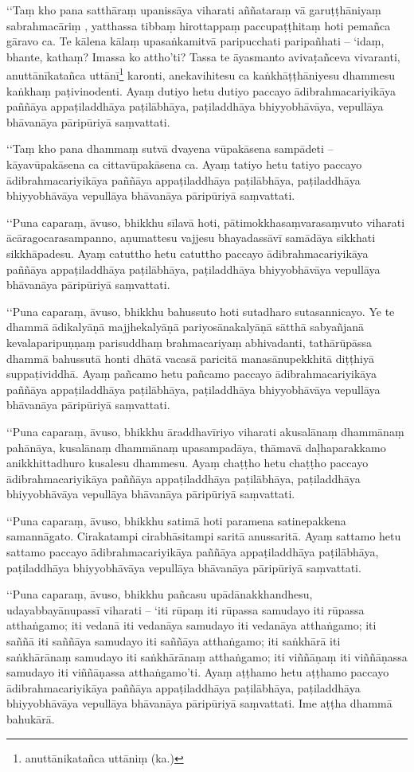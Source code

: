 ‘‘Taṃ kho pana satthāraṃ upanissāya viharati aññataraṃ vā garuṭṭhāniyaṃ sabrahmacāriṃ , yatthassa tibbaṃ hirottappaṃ paccupaṭṭhitaṃ hoti pemañca gāravo ca. Te kālena kālaṃ upasaṅkamitvā paripucchati paripañhati – ‘idaṃ, bhante, kathaṃ? Imassa ko attho’ti? Tassa te āyasmanto avivaṭañceva vivaranti, anuttānīkatañca uttānī\footnote{anuttānikatañca uttāniṃ (ka.)} karonti, anekavihitesu ca kaṅkhāṭṭhāniyesu dhammesu kaṅkhaṃ paṭivinodenti. Ayaṃ dutiyo hetu dutiyo paccayo ādibrahmacariyikāya paññāya appaṭiladdhāya paṭilābhāya, paṭiladdhāya bhiyyobhāvāya, vepullāya bhāvanāya pāripūriyā saṃvattati.

‘‘Taṃ kho pana dhammaṃ sutvā dvayena vūpakāsena sampādeti – kāyavūpakāsena ca cittavūpakāsena ca. Ayaṃ tatiyo hetu tatiyo paccayo ādibrahmacariyikāya paññāya appaṭiladdhāya paṭilābhāya, paṭiladdhāya bhiyyobhāvāya vepullāya bhāvanāya pāripūriyā saṃvattati.

‘‘Puna caparaṃ, āvuso, bhikkhu sīlavā hoti, pātimokkhasaṃvarasaṃvuto viharati ācāragocarasampanno, aṇumattesu vajjesu bhayadassāvī samādāya sikkhati sikkhāpadesu. Ayaṃ catuttho hetu catuttho paccayo ādibrahmacariyikāya paññāya appaṭiladdhāya paṭilābhāya, paṭiladdhāya bhiyyobhāvāya vepullāya bhāvanāya pāripūriyā saṃvattati.

‘‘Puna caparaṃ, āvuso, bhikkhu bahussuto hoti sutadharo sutasannicayo. Ye te dhammā ādikalyāṇā majjhekalyāṇā pariyosānakalyāṇā sātthā sabyañjanā kevalaparipuṇṇaṃ parisuddhaṃ brahmacariyaṃ abhivadanti, tathārūpāssa dhammā bahussutā honti dhātā vacasā paricitā manasānupekkhitā diṭṭhiyā suppaṭividdhā. Ayaṃ pañcamo hetu pañcamo paccayo ādibrahmacariyikāya paññāya appaṭiladdhāya paṭilābhāya, paṭiladdhāya bhiyyobhāvāya vepullāya bhāvanāya pāripūriyā saṃvattati.

‘‘Puna caparaṃ, āvuso, bhikkhu āraddhavīriyo viharati akusalānaṃ dhammānaṃ pahānāya, kusalānaṃ dhammānaṃ upasampadāya, thāmavā daḷhaparakkamo anikkhittadhuro kusalesu dhammesu. Ayaṃ chaṭṭho hetu chaṭṭho paccayo ādibrahmacariyikāya paññāya appaṭiladdhāya paṭilābhāya, paṭiladdhāya bhiyyobhāvāya vepullāya bhāvanāya pāripūriyā saṃvattati.

‘‘Puna caparaṃ, āvuso, bhikkhu satimā hoti paramena satinepakkena samannāgato. Cirakatampi cirabhāsitampi saritā anussaritā. Ayaṃ sattamo hetu sattamo paccayo ādibrahmacariyikāya paññāya appaṭiladdhāya paṭilābhāya, paṭiladdhāya bhiyyobhāvāya vepullāya bhāvanāya pāripūriyā saṃvattati.

‘‘Puna caparaṃ, āvuso, bhikkhu pañcasu upādānakkhandhesu, udayabbayānupassī viharati – ‘iti rūpaṃ iti rūpassa samudayo iti rūpassa atthaṅgamo; iti vedanā iti vedanāya samudayo iti vedanāya atthaṅgamo; iti saññā iti saññāya samudayo iti saññāya atthaṅgamo; iti saṅkhārā iti saṅkhārānaṃ samudayo iti saṅkhārānaṃ atthaṅgamo; iti viññāṇaṃ iti viññāṇassa samudayo iti viññāṇassa atthaṅgamo’ti. Ayaṃ aṭṭhamo hetu aṭṭhamo paccayo ādibrahmacariyikāya paññāya appaṭiladdhāya paṭilābhāya, paṭiladdhāya bhiyyobhāvāya vepullāya bhāvanāya pāripūriyā saṃvattati. Ime aṭṭha dhammā bahukārā.

